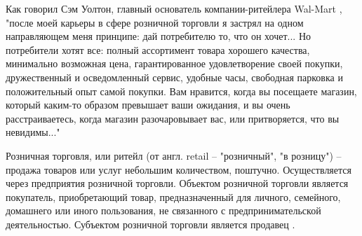 %
%
%
%
%
%
%
%
%
%
%
%
%
%
%


\label{sec:introduction}

Как говорил Сэм Уолтон, главный основатель компании-ритейлера Wal-Mart \cite{retail_management_review}, "после моей карьеры в сфере розничной торговли я застрял на одном направляющем меня принципе: дай потребителю то, что он хочет... Но потребители хотят все: полный ассортимент товара хорошего качества, минимально возможная цена, гарантированное удовлетворение своей покупки, дружественный и осведомленный сервис, удобные часы, свободная парковка и положительный опыт самой покупки. Вам нравится, когда вы посещаете магазин, который каким-то образом превышает ваши ожидания, и вы очень расстраиваетесь, когда магазин разочаровывает вас, или притворяется, что вы невидимы..."

Розничная торговля, или ритейл (от англ. retail – "розничный", "в розницу") – продажа товаров или услуг небольшим количеством, поштучно. Осуществляется через предприятия розничной торговли. Объектом розничной торговли является покупатель, приобретающий товар, предназначенный для личного, семейного, домашнего или иного пользования, не связанного с предпринимательской деятельностью. Субъектом розничной торговли является продавец \cite{retail_definition}.

